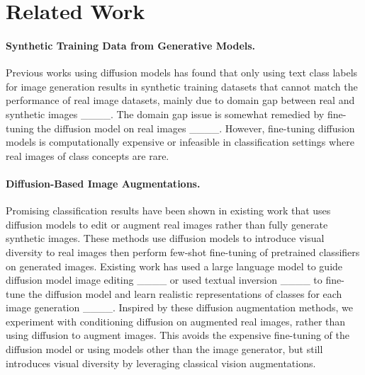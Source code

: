 \section{Related Work}
\vspace{-0.3cm}
\paragraph{Synthetic Training Data from Generative Models.}
Previous works using diffusion models has found that only using text class labels for image generation results in synthetic training datasets that cannot match the performance of real image datasets, mainly due to domain gap between real and synthetic images ____. 
The domain gap issue is somewhat remedied by fine-tuning the diffusion model on real images ____. However, fine-tuning diffusion models is computationally expensive or infeasible in classification settings where real images of class concepts are rare.

\vspace{-0.3cm}
\paragraph{Diffusion-Based Image Augmentations.}
Promising classification results have been shown in existing work that uses diffusion models to edit or augment real images rather than fully generate synthetic images. 
These methods use diffusion models to introduce visual diversity to real images then perform few-shot fine-tuning of pretrained classifiers on generated images. 
Existing work has used a large language model to guide diffusion model image editing ____ or used textual inversion ____ to fine-tune the diffusion model and learn realistic representations of classes for each image generation ____. 
Inspired by these diffusion augmentation methods, we experiment with conditioning diffusion on augmented real images, rather than using diffusion to augment images. 
This avoids the expensive fine-tuning of the diffusion model or using models other than the image generator, but still introduces visual diversity by leveraging classical vision augmentations. 

\vspace{-0.3cm}
